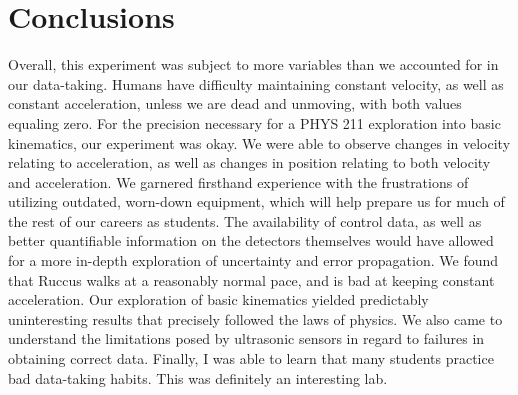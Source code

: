\documentclass[hidelinks, 12pt, letterpaper]{article}
\begin{document}
\section{Conclusions}
Overall, this experiment was subject to more variables
than we accounted for in our data-taking.
Humans have difficulty maintaining constant velocity,
as well as constant acceleration, unless we are dead and 
unmoving, with both values equaling zero.
For the precision necessary for a PHYS 211 exploration into
basic kinematics, our experiment was okay.
We were able to observe changes in velocity relating to 
acceleration, as well as changes in position relating to 
both velocity and acceleration.
We garnered firsthand experience with the frustrations
of utilizing outdated, worn-down equipment,
which will help prepare us for much of the rest of our
careers as  students.
The availability of control data, as well as better
quantifiable information on the detectors themselves
would have allowed for a more in-depth exploration 
of uncertainty and error propagation.
We found that Ruccus walks at a reasonably normal
pace, and is bad at keeping constant acceleration. 
Our exploration of basic kinematics yielded predictably
uninteresting results that precisely followed the laws
of physics.
We also came to understand the limitations posed by
ultrasonic sensors in regard to failures in obtaining 
correct data.
Finally, I was able to learn that many students practice 
bad data-taking habits. 
This was definitely an interesting lab.
\end{document}
